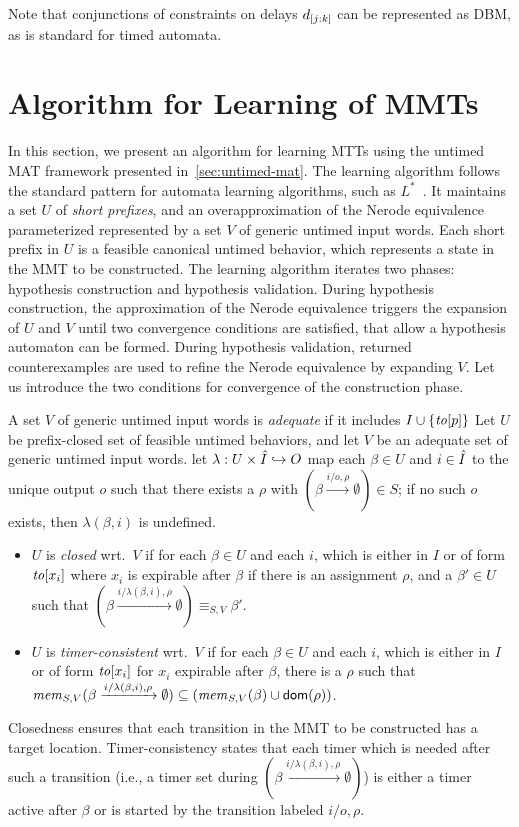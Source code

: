   Note that conjunctions of constraints on delays $\delay{j}{k}$ can be represented as DBM, as is standard for timed automata.

\section{Algorithm for Learning of MMTs}
\label{sec:learning}

In this section, we present an algorithm for learning MTTs using the untimed
MAT framework presented in~\ref{sec:untimed-mat}.
The learning algorithm follows the standard pattern for automata learning
algorithms, such as $L^*$~\cite{Ang87}. It maintains
a set $U$ of {\em short prefixes}, and
  an overapproximation of the Nerode equivalence
  parameterized represented by a set $V$ of generic untimed input words.
Each short prefix in $U$ is a feasible canonical untimed
behavior, which represents a state in the MMT to be constructed.
The learning algorithm iterates two phases: hypothesis construction and
hypothesis validation.
During hypothesis construction,
the approximation of the Nerode equivalence triggers the expansion of
$U$ and $V$ until two convergence conditions are satisfied, that allow
a hypothesis automaton can be formed.
During hypothesis validation, returned counterexamples are used to refine
the Nerode equivalence by expanding $V$.
Let us introduce the two conditions for convergence of the construction phase.

A set $V$ of generic untimed input words is {\em adequate} if it includes
$I \cup \set{\toevent{p}}$
Let $U$ be prefix-closed set of feasible untimed behaviors,
and let $V$ be an adequate set of generic untimed input words.
let $\lambda:  U \times \extinputs \hookrightarrow O$
map each $\beta \in U$ and $i \in \extinputs$ to the unique 
output $o$ such that there exists a $\rho$ with
$(\beta \xrightarrow{i/o,\rho} \emptyset) \in S$; if no such $o$ exists, then
$\lambda(\beta,i)$ is undefined.
\begin{itemize}
\item
$U$ is {\em closed} wrt.\ $V$ if 
  for each $\beta \in U$ and each
  $i$, which is either in $I$ or
  of form $\toevent{x_i}$ where $x_i$ is expirable after $\beta$ if
  there is an assignment $\rho$, and a $\beta' \in U$ such that
  $(\beta \xrightarrow{i/\lambda(\beta,i),\rho} \emptyset) \equiv_{S,V} \beta'$.
\item
$U$ is {\em timer-consistent} wrt.\ $V$ if 
  for each $\beta \in U$ and each
  $i$, which is either in $I$ or
  of form $\toevent{x_i}$ for $x_i$ expirable after $\beta$, there is a $\rho$
  such that
  $\getmemorable{S}{\beta \xrightarrow{i/\lambda(\beta,i),\rho} \emptyset}{V} \subseteq
  (\getmemorable{S}{\beta}{V} \cup \domof{\rho})$.
\end{itemize}
Closedness ensures that each transition in the MMT to be constructed has a target location. 
Timer-consistency states that each timer which is needed after such
a transition (i.e., a timer set during $(\beta \xrightarrow{i/\lambda(\beta,i),\rho} \emptyset)$)
is either a timer active after $\beta$ or is started by the transition
labeled $i/o,\rho$.

